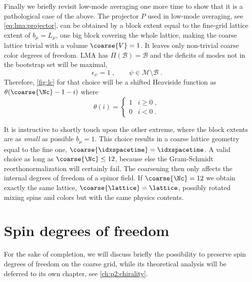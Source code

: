 Finally we briefly revisit low-mode averaging one more time to show that it is a pathological case of the above.
The projector $P$ used in low-mode averaging, see \cref{eq:lma:projector}, can be obtained by a block extent equal to the fine-grid lattice extent of $b_{\mu} = L_{\mu}$, \ie one big block covering the whole lattice, making the coarse lattice trivial with a volume $\coarse{V} = 1$.
It leaves only non-trivial coarse color degrees of freedom.
LMA has $\Pi(\mathcal{B}) = \mathcal{B}$ and the deficits of modes not in the bootstrap set will be maximal,
\begin{equation}
\epsilon_\psi = 1 \;,
\qquad
\psi \in \mathcal{M} \setminus \mathcal{B} \;.
\end{equation}
Therefore, \cref{fig:lc} for that choice will be a shifted Heaviside function as $\theta(\coarse{\Nc} -1 - i)$ where
\begin{equation}
\theta(i) = \begin{cases}
1 & i \geq 0 \;,  \\
0 & i < 0 \;.
\end{cases}
\end{equation}

It is instructive to shortly touch upon the other extreme, where the block extents are as \emph{small} as possible $b_{\mu} = 1$.
This choice results in a coarse lattice geometry equal to the fine one, $\coarse{\idxspacetime} = \idxspacetime$.
A valid choice as long as $\coarse{\Nc} \leq 12$, because else the Gram-Schmidt reorthonormalization will certainly fail.
The coarsening then only affects the internal degrees of freedom of a spinor field.
If $\coarse{\Nc} = 12$ we obtain exactly the same lattice, $\coarse{\lattice} = \lattice$, possibly rotated mixing spins and colors but with the same physics contents.



\section{Spin degrees of freedom}
\label{sec:lc:spin}

For the sake of completion, we will discuss briefly the possibility to preserve spin degrees of freedom on the coarse grid, while its theoretical analysis will be deferred to its own chapter, see \cref{ch:p2:chirality}.

